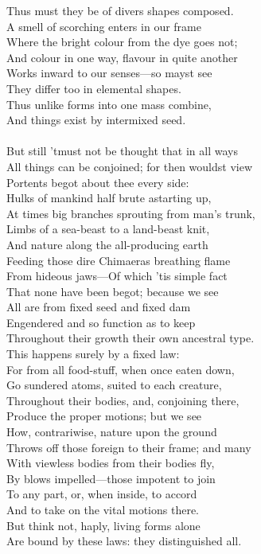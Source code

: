 Thus must they be of divers shapes composed.\\
A smell of scorching enters in our frame\\
Where the bright colour from the dye goes not;\\
And colour in one way, flavour in quite another\\
Works inward to our senses—so mayst see\\
They differ too in elemental shapes.\\
Thus unlike forms into one mass combine,\\
And things exist by intermixed seed.\\
\\
But still 'tmust not be thought that in all ways\\
All things can be conjoined; for then wouldst view\\
Portents begot about thee every side:\\
Hulks of mankind half brute astarting up,\\
At times big branches sprouting from man's trunk,\\
Limbs of a sea-beast to a land-beast knit,\\
And nature along the all-producing earth\\
Feeding those dire Chimaeras breathing flame\\
From hideous jaws—Of which 'tis simple fact\\
That none have been begot; because we see\\
All are from fixed seed and fixed dam\\
Engendered and so function as to keep\\
Throughout their growth their own ancestral type.\\
This happens surely by a fixed law:\\
For from all food-stuff, when once eaten down,\\
Go sundered atoms, suited to each creature,\\
Throughout their bodies, and, conjoining there,\\
Produce the proper motions; but we see\\
How, contrariwise, nature upon the ground\\
Throws off those foreign to their frame; and many\\
With viewless bodies from their bodies fly,\\
By blows impelled—those impotent to join\\
To any part, or, when inside, to accord\\
And to take on the vital motions there.\\
But think not, haply, living forms alone\\
Are bound by these laws: they distinguished all.

